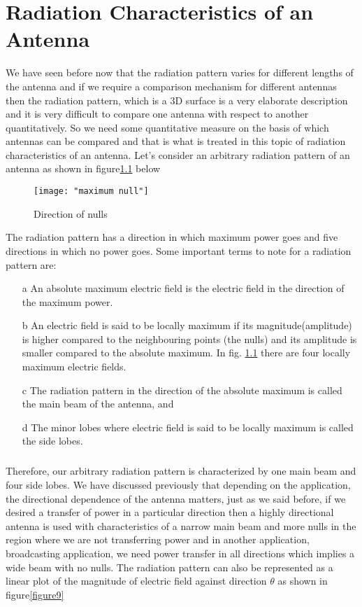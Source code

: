 \chapter{Radiation Characteristics of an Antenna}
We have seen before now that the radiation pattern varies for different lengths of the antenna and if we require a comparison mechanism for different antennas then the radiation pattern, which is a 3D surface is a very elaborate description and it is very difficult to compare one antenna with respect to another quantitatively. So we need some quantitative measure on the basis of which antennas can be compared and that is what is treated in this topic of radiation characteristics of an antenna.
Let's consider an arbitrary radiation pattern of an antenna as shown in figure\ref{figure8} below

\begin{figure}[h]
	\centering
	\texttt{[image: "maximum null"]}
	\caption{Direction of nulls}
	\label{figure8}
\end{figure}


The radiation pattern has a direction in which maximum power goes and five directions in which no power goes. Some important terms to note for a radiation pattern are:
\begin{enumerate}
	\item [a]	An absolute maximum electric field is the electric field in the direction of the maximum power.
	\item [b]	An electric field is said to be locally maximum if its magnitude(amplitude) is higher compared to the neighbouring points (the nulls) and its amplitude is smaller compared to the absolute maximum. In fig. \ref{figure8} there are four locally maximum electric fields.
	\item [c]	The radiation pattern in the direction of the absolute maximum is called the main beam of the antenna, and
	\item [d] 	The minor lobes where electric field is said to be locally maximum is called the side lobes.
\end{enumerate}

\paragraph{}
Therefore, our arbitrary radiation pattern is characterized by one main beam and four side lobes. We have discussed previously that depending on the application, the directional dependence of the antenna matters, just as we said before, if we desired a transfer of power in a particular direction then a highly directional antenna is used with characteristics of a narrow main beam and more nulls in the region where we are not transferring power and in another application, broadcasting application, we need power transfer in all directions which implies a wide beam with no nulls.
The radiation pattern can also be represented as a linear plot of the magnitude of electric field against direction $\theta$  as shown in figure\ref{figure9}

